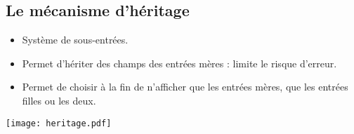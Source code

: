 \subsection{Le mécanisme d'héritage}

\begin{slide}
  \begin{itemize}
    \item Système de sous-entrées.
    \item Permet d'hériter des champs des entrées mères : limite le risque d'erreur.
    \item Permet de choisir à la fin de n'afficher que les entrées mères, que les entrées filles ou les deux.
\end{itemize}
\end{slide}

\begin{slide}
 \centering
 \texttt{[image: heritage.pdf]}

 \cite{Maraval1998}
\end{slide}

